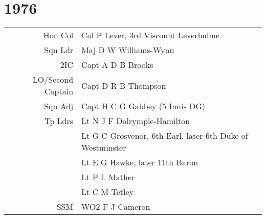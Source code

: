 \chapter*{1976}

\begin{center}
  \small
  \begin{tabular}{rl}
    Hon Col & Col P Lever, 3rd Viscount Leverhulme \\
    Sqn Ldr & Maj D W Williams-Wynn \\
    2IC & Capt A D B Brooks \\
    LO/Second Captain & Capt D R B Thompson \\
    Sqn Adj & Capt H C G Gabbey (5 Innis DG) \\
    Tp Ldrs & Lt N J F Dalrymple-Hamilton \\
      & Lt G C Grosvenor, 6th Earl, later 6th Duke of Westminster \\
      & Lt E G Hawke, later 11th Baron \\
      & Lt P L Mather \\
      & Lt C M Tetley \\
    SSM & WO2 F J Cameron \\
  \end{tabular}
\end{center}

